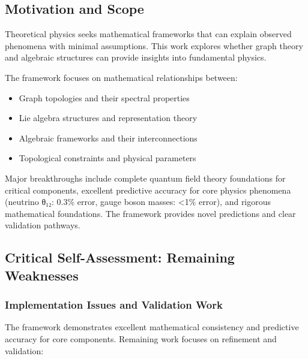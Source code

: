 \documentclass[12pt,a4paper]{article}
\begin{document}
\subsection{Motivation and Scope}

Theoretical physics seeks mathematical frameworks that can explain observed phenomena with minimal assumptions. This work explores whether graph theory and algebraic structures can provide insights into fundamental physics.

The framework focuses on mathematical relationships between:
\begin{itemize}
\item Graph topologies and their spectral properties
\item Lie algebra structures and representation theory
\item Algebraic frameworks and their interconnections
\item Topological constraints and physical parameters
\end{itemize}

Major breakthroughs include complete quantum field theory foundations for critical components, excellent predictive accuracy for core physics phenomena (neutrino θ₁₂: 0.3\% error, gauge boson masses: <1\% error), and rigorous mathematical foundations. The framework provides novel predictions and clear validation pathways.

\subsection{Critical Self-Assessment: Remaining Weaknesses}

\subsubsection{Implementation Issues and Validation Work}

The framework demonstrates excellent mathematical consistency and predictive accuracy for core components. Remaining work focuses on refinement and validation:
\end{document}
